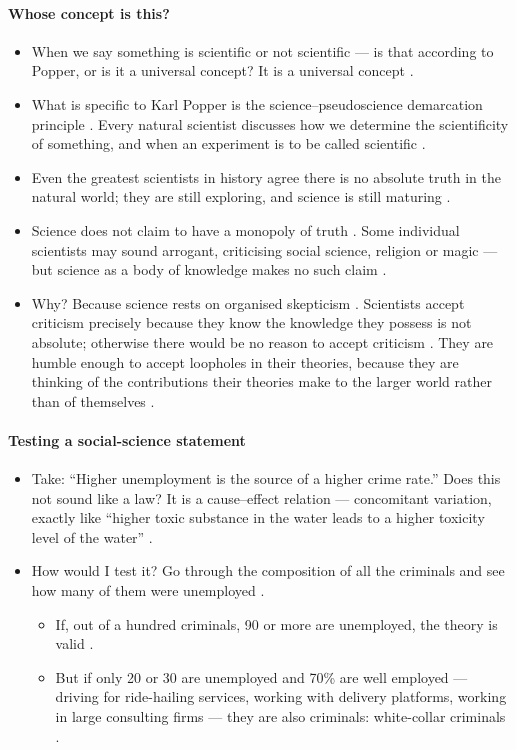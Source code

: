 \paragraph{Whose concept is this?}
\begin{itemize}
    \item When we say something is scientific or not scientific --- is that according to Popper, or is it a universal concept? It is a universal concept .
    \item What is specific to Karl Popper is the science--pseudoscience demarcation principle . Every natural scientist discusses how we determine the scientificity of something, and when an experiment is to be called scientific .
    \item Even the greatest scientists in history agree there is no absolute truth in the natural world; they are still exploring, and science is still maturing .
    \item Science does not claim to have a monopoly of truth . Some individual scientists may sound arrogant, criticising social science, religion or magic --- but science as a body of knowledge makes no such claim .
    \item Why? Because science rests on organised skepticism . Scientists accept criticism precisely because they know the knowledge they possess is not absolute; otherwise there would be no reason to accept criticism . They are humble enough to accept loopholes in their theories, because they are thinking of the contributions their theories make to the larger world rather than of themselves .
\end{itemize}

\paragraph{Testing a social-science statement}
\begin{itemize}
    \item Take: ``Higher unemployment is the source of a higher crime rate.''  Does this not sound like a law?  It is a cause--effect relation --- concomitant variation, exactly like ``higher toxic substance in the water leads to a higher toxicity level of the water'' .
    \item How would I test it? Go through the composition of all the criminals and see how many of them were unemployed .
    \begin{itemize}
        \item If, out of a hundred criminals, 90 or more are unemployed, the theory is valid .
        \item But if only 20 or 30 are unemployed and 70\% are well employed --- driving for ride-hailing services, working with delivery platforms, working in large consulting firms --- they are also criminals: white-collar criminals .
    \end{itemize}
\end{itemize}

